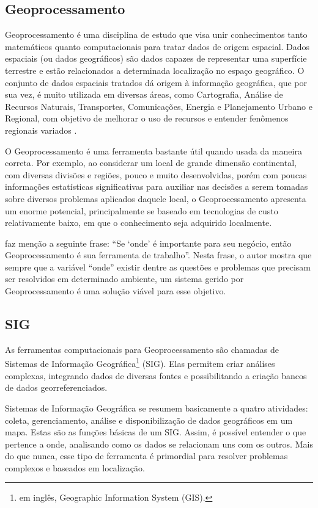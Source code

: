 \documentclass[12pt]{article}
\begin{document}
\subsection{Geoprocessamento}

Geoprocessamento é uma disciplina de estudo que visa unir conhecimentos tanto matemáticos quanto computacionais para tratar dados de origem espacial. Dados espaciais (ou dados geográficos) são dados capazes de representar uma superfície terrestre e estão relacionados a determinada localização no espaço geográfico. O conjunto de dados espaciais tratados dá origem à informação geográfica, que por sua vez, é muito utilizada em diversas áreas, como Cartografia, Análise de Recursos Naturais, Transportes, Comunicações, Energia e Planejamento Urbano e Regional, com objetivo de melhorar o uso de recursos e entender fenômenos regionais variados \citep{introci}.

O Geoprocessamento é uma ferramenta bastante útil quando usada da maneira correta. Por exemplo, ao considerar um local de grande dimensão continental, com diversas divisões e regiões, pouco e muito desenvolvidas, porém com poucas informações estatísticas significativas para auxiliar nas decisões a serem tomadas sobre diversos problemas aplicados daquele local, o Geoprocessamento apresenta um enorme potencial, principalmente se baseado em tecnologias de custo relativamente baixo, em que o conhecimento seja adquirido localmente.

\citeauthor{introci} faz menção a seguinte frase: “Se `onde' é importante para seu negócio, então Geoprocessamento é sua ferramenta de trabalho”. Nesta frase, o autor mostra que sempre que a variável ``onde'' existir dentre as questões e problemas que precisam ser resolvidos em determinado ambiente, um sistema gerido por Geoprocessamento é uma solução viável para esse objetivo.

\subsection{SIG}

As ferramentas computacionais para Geoprocessamento são chamadas de Sistemas de Informação Geográfica\footnote{em inglês, Geographic Information System (GIS).} (SIG). Elas permitem criar análises complexas, integrando dados de diversas fontes e possibilitando a criação bancos de dados georreferenciados. 

Sistemas de Informação Geográfica se resumem basicamente a quatro atividades: coleta, gerenciamento, análise e disponibilização de dados geográficos em um mapa. Estas são as funções básicas de um SIG. Assim, é possível entender o que pertence a onde, analisando como os dados se relacionam uns com os outros. Mais do que nunca, esse tipo de ferramenta é primordial para resolver problemas complexos e baseados em localização.
\end{document}
